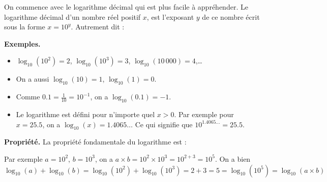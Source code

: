 \documentclass[11pt,class=report,crop=false]{standalone}
\begin{document}





\bigskip




\begin{cours}


On commence avec le logarithme décimal qui est plus facile à appréhender.
Le logarithme décimal d'un nombre réel positif $x$, est l'exposant $y$ de ce nombre écrit sous la forme $x=10^y$.
Autrement dit :

\textbf{Exemples.}

\begin{itemize}
  \item $\log_{10}(10^2) = 2$, $\log_{10}(10^3) = 3$, $\log_{10}(10\,000) = 4$,\ldots
  \item On a aussi $\log_{10}(10)=1$, $\log_{10}(1)=0$.
  \item Comme $0.1 = \frac{1}{10} = 10^{-1}$, on a $\log_{10}(0.1)=-1$.
  \item Le logarithme est défini pour n'importe quel $x>0$.
  Par exemple pour $x = 25.5$, on a $\log_{10}(x) = 1.4065\ldots$
  Ce qui signifie que $10^{1.4065\ldots} = 25.5$.

  \end{itemize}

\textbf{Propriété.}
La propriété fondamentale du logarithme est :

Par exemple $a = 10^2$, $b=10^3$, on a $a\times b  = 10^2 \times 10^3 = 10^{2+3} = 10^5$. On a bien 
$$\log_{10}(a) + \log_{10}(b) = \log_{10}(10^2) + \log_{10}(10^3)
= 2+3 = 5 = \log_{10}(10^5)= \log_{10}(a \times b) $$


\end{cours}
\end{document}
